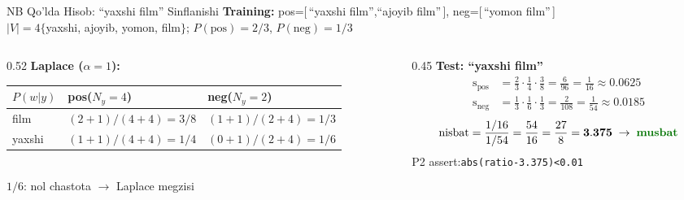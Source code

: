 \documentclass[aspectratio=169,11pt]{beamer}
\begin{document}
%
\begin{frame}{NB Qo'lda Hisob: ``yaxshi film'' Sinflanishi}
  \small
  \textbf{Training:}\;
  pos=[\,``yaxshi film'',``ajoyib film''\,],\;
  neg=[\,``yomon film''\,]\\[2pt]
  $|V|{=}4$\;$\{$yaxshi, ajoyib, yomon, film$\}$;\quad
  $P(\text{pos}){=}2/3$,\; $P(\text{neg}){=}1/3$
  \vspace{5pt}
  \begin{columns}[T]
    \begin{column}{0.52\textwidth}
      \textbf{Laplace ($\alpha{=}1$):}\\[3pt]
      \footnotesize
      \begin{tabular}{@{}lll@{}}
        \toprule
        $P(w|y)$ & pos\;($N_y{=}4$) & neg\;($N_y{=}2$) \\
        \midrule
        film   & $(2{+}1)/(4{+}4)=3/8$ & $(1{+}1)/(2{+}4)=1/3$ \\
        yaxshi & $(1{+}1)/(4{+}4)=1/4$ &
                 \alert{$(0{+}1)/(2{+}4)=1/6$} \\
        \bottomrule
      \end{tabular}\\[3pt]
      \textcolor{halfgray}{\tiny
        \alert{$1/6$}: nol chastota $\to$ Laplace megzisi}
    \end{column}
    \begin{column}{0.45\textwidth}
      \textbf{Test: ``yaxshi film''}\\[3pt]
      \small
      \begin{align*}
        \text{s}_{\text{pos}}
          &=\tfrac{2}{3}\cdot\tfrac{1}{4}\cdot\tfrac{3}{8}
          =\tfrac{6}{96}=\tfrac{1}{16}\approx 0.0625\\[4pt]
        \text{s}_{\text{neg}}
          &=\tfrac{1}{3}\cdot\tfrac{1}{6}\cdot\tfrac{1}{3}
          =\tfrac{2}{108}=\tfrac{1}{54}\approx 0.0185
      \end{align*}
      \[
        \text{nisbat}
        =\frac{1/16}{1/54}
        =\frac{54}{16}
        =\frac{27}{8}
        =\mathbf{3.375}
        \;\to\;\textcolor{deepgreen}{\textbf{musbat}}
      \]
      \footnotesize\textcolor{halfgray}{%
        P2 assert:\;\texttt{abs(ratio-3.375)<0.01}}
    \end{column}
  \end{columns}
\end{frame}
\end{document}
